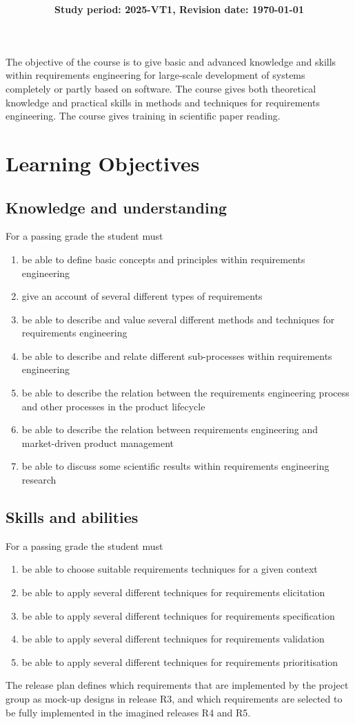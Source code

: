 \documentclass{program}
\title{\bf\sffamily\fontsize{18}{18}\selectfont{
Course Program\\
\COURSECODE~\COURSETITLE\\
http://cs.lth.se/krav 
}}
\author{\bf\sffamily\fontsize{11}{11}\selectfont{Kursansvarig: Björn Regnell}}
\date{\bf\sffamily\fontsize{10}{10}\selectfont%
{Study period: 2025-VT1, Revision date: \today}}
\begin{document}
\maketitle
\noindent 
The objective of the course is to give basic and advanced knowledge and skills within requirements engineering for large-scale development of systems completely or partly based on software. The course gives both theoretical knowledge and practical skills in methods and techniques for requirements engineering. The course gives training in scientific paper reading.

\section{Learning Objectives}
\subsection{Knowledge and understanding}
For a passing grade the student must
\begin{enumerate}[noitemsep]
\item be able to define basic concepts and principles within requirements engineering 
\item give an account of several different types of requirements
\item be able to describe and value several different methods and techniques for requirements engineering
\item be able to describe and relate different sub-processes within requirements engineering
\item be able to describe the relation between the requirements engineering process and other processes in the product lifecycle
\item be able to describe the relation between requirements engineering and market-driven product management
\item be able to discuss some scientific results within requirements engineering research
\end{enumerate}


\subsection{Skills and abilities}
For a passing grade the student must
\begin{enumerate}[noitemsep]
\item be able to choose suitable requirements techniques for a given context
\item     be able to apply several different techniques for requirements elicitation
\item     be able to apply several different techniques for requirements specification
\item     be able to apply several different techniques for requirements validation
\item     be able to apply several different techniques for requirements prioritisation
\end{enumerate}
  The release plan defines which requirements that are implemented by the project group as mock-up designs in release R3, and which requirements are selected to be fully implemented in the imagined releases R4 and R5. 
\end{document}
